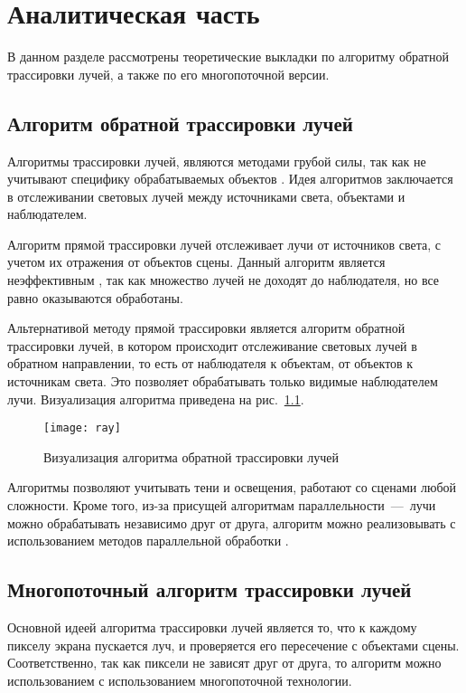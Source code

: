 \chapter{Аналитическая часть}

В данном разделе рассмотрены теоретические выкладки по алгоритму обратной трассировки лучей, а также по его многопоточной версии.

\section{Алгоритм обратной трассировки лучей}
Алгоритмы трассировки лучей, являются методами грубой силы, так как не учитывают специфику обрабатываемых объектов \cite{bib:rojers}. Идея алгоритмов заключается в отслеживании световых лучей между источниками света, объектами и наблюдателем. 

Алгоритм прямой трассировки лучей отслеживает лучи от источников света, с учетом их отражения от объектов сцены. Данный алгоритм является неэффективным \cite{bib:rojers}, так как множество лучей не доходят до наблюдателя, но все равно оказываются обработаны.

Альтернативой методу прямой трассировки является алгоритм обратной трассировки лучей, в котором происходит отслеживание световых лучей в обратном направлении, то есть от наблюдателя к объектам, от объектов к источникам света. Это позволяет обрабатывать только видимые наблюдателем лучи. Визуализация алгоритма приведена на рис.~\ref{img:raytracing}.

\noindent
\begin{figure}[h!]
	\centering
    \texttt{[image: ray]}
    \caption{Визуализация алгоритма обратной трассировки лучей}
    \label{img:raytracing}
\end{figure}

Алгоритмы позволяют учитывать тени и освещения, работают со сценами любой сложности. Кроме того, из-за присущей алгоритмам параллельности~---~лучи можно обрабатывать независимо друг от друга, алгоритм можно реализовывать с использованием методов параллельной обработки \cite{bib:parallel_ray}.

\section{Многопоточный алгоритм трассировки лучей}

Основной идеей алгоритма трассировки лучей является то, что к каждому пикселу экрана пускается луч, и проверяется его пересечение с объектами сцены. Соответственно, так как пиксели не зависят друг от друга, то алгоритм можно использованием с использованием многопоточной технологии.

